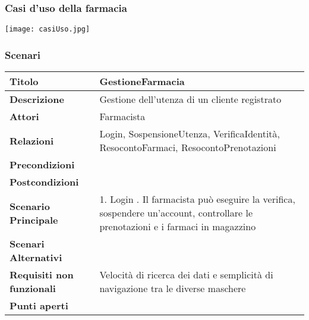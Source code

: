 \newpage %
\subsubsection{Casi d'uso della farmacia}

\texttt{[image: casiUso.jpg]}

\newpage %
\subsubsection{Scenari}
\hfill \break

\begin{tabular} {|P{4.5cm}|P{12.5cm}|}
\hline  
  \textbf{Titolo} & GestioneFarmacia \\
\hline
  \textbf{Descrizione} & Gestione dell'utenza di un cliente registrato \\
\hline
  \textbf{Attori} & Farmacista\\
\hline
  \textbf{Relazioni} & Login, SospensioneUtenza, VerificaIdentità, ResocontoFarmaci, ResocontoPrenotazioni\\
\hline
  \textbf{Precondizioni} & \\
\hline
  \textbf{Postcondizioni} & \\
\hline
  \textbf{Scenario Principale} & 1. Login . Il farmacista può eseguire la verifica, sospendere un'account, controllare le prenotazioni e i farmaci in magazzino\\
\hline
  \textbf{Scenari Alternativi} &\\
\hline
  \textbf{Requisiti non funzionali} & Velocità di ricerca dei dati e semplicità di navigazione tra le diverse maschere\\
\hline
  \textbf{Punti aperti} &\\
\hline
\end{tabular}
\hfill
\break

